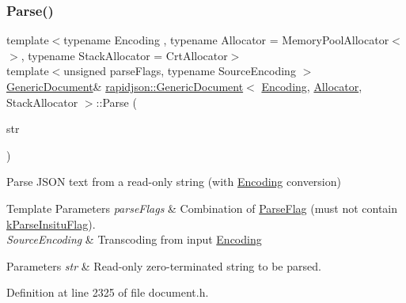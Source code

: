 \subsubsection{\texorpdfstring{Parse()}{Parse()}\hspace{0.1cm}{\footnotesize\ttfamily [1/6]}}
{\footnotesize\ttfamily template$<$typename Encoding , typename Allocator  = Memory\+Pool\+Allocator$<$$>$, typename Stack\+Allocator  = Crt\+Allocator$>$ \\
template$<$unsigned parse\+Flags, typename Source\+Encoding $>$ \\
\mbox{\hyperlink{classrapidjson_1_1_generic_document}{Generic\+Document}}\& \mbox{\hyperlink{classrapidjson_1_1_generic_document}{rapidjson\+::\+Generic\+Document}}$<$ \mbox{\hyperlink{classrapidjson_1_1_encoding}{Encoding}}, \mbox{\hyperlink{classrapidjson_1_1_allocator}{Allocator}}, Stack\+Allocator $>$\+::Parse (\begin{DoxyParamCaption}\item[{const typename Source\+Encoding\+::\+Ch $\ast$}]{str }\end{DoxyParamCaption})}



Parse J\+S\+ON text from a read-\/only string (with \mbox{\hyperlink{classrapidjson_1_1_encoding}{Encoding}} conversion) 


\begin{DoxyTemplParams}{Template Parameters}
{\em parse\+Flags} & Combination of \mbox{\hyperlink{namespacerapidjson_a81379eb4e94a0386d71d15fda882ebc9}{Parse\+Flag}} (must not contain \mbox{\hyperlink{namespacerapidjson_a81379eb4e94a0386d71d15fda882ebc9a02748971d6ea0c5e22c69b8aa7f344ea}{k\+Parse\+Insitu\+Flag}}). \\
\hline
{\em Source\+Encoding} & Transcoding from input \mbox{\hyperlink{classrapidjson_1_1_encoding}{Encoding}} \\
\hline
\end{DoxyTemplParams}

\begin{DoxyParams}{Parameters}
{\em str} & Read-\/only zero-\/terminated string to be parsed. \\
\hline
\end{DoxyParams}


Definition at line 2325 of file document.\+h.


\begin{DoxyCode}{0}

\end{DoxyCode}


